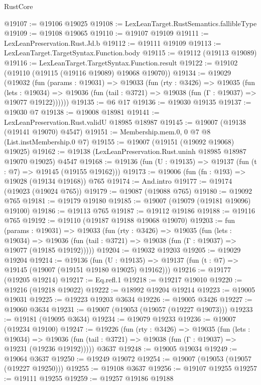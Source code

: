 \begin{lexlean}{RustCore}
\begin{coremodule}
@19107 := @19106 @19025
@19108 := LexLeanTarget.RustSemantics.fallibleType
@19109 := @19108 @19065
@19110 := @19107 @19109
@19111 := LexLeanPreservation.Rust.Jd.b
@19112 := @19111 @19109
@19113 := LexLeanTarget.TargetSyntax.Function.body
@19115 := @19112 (@19113 @19089)
@19116 := LexLeanTarget.TargetSyntax.Function.result
@19122 := @19102 (@19110 (@19115 (@19116 @19089) @19068 @19070))
@19134 := @19029
    (@19032
      (fun (params : @19031) =>
      @19033
        (fun (rty : @3426) =>
        @19035
          (fun (lets : @19034) =>
          @19036 (fun (tail : @3721) => @19038 (fun (Γ : @19037) => @19077 @19122))))))
@19135 := @6 @17
@19136 := @19030 @19135
@19137 := @19030 @7
@19138 := @19008 @18981
@19141 := LexLeanPreservation.Rust.validU @18985 @18987
@19145 := @19007 (@19138 (@19141 @19070) @4547)
@19151 := Membership.mem.{0, 0} @7 @8 (List.instMembership.{0} @7)
@19155 := @19007 (@19151 (@19092 @19068) @19025)
@19162 := @19138 (LexLeanPreservation.Rust.uninh @18985 @18987 @19070 @19025) @4547
@19168 := @19136 (fun (U : @19135) => @19137 (fun (t : @7) => @19145 (@19155 @19162)))
@19173 := @19006 (fun (fn : @193) => @19028 (@19134 @19168)) @765
@19174 := And.intro
@19177 := @19174 (@19023 (@19024 @765))
@19179 := @19087 (@19088 @765)
@19180 := @19092 @765
@19181 := @19179 @19180
@19185 := @19007 (@19079 (@19181 @19096) @19100)
@19186 := @19113 @765
@19187 := @19112 @19186
@19188 := @19116 @765
@19192 := @19110 (@19187 @19188 @19068 @19070)
@19203 := fun (params : @19031) =>
  @19033
    (fun (rty : @3426) =>
    @19035
      (fun (lets : @19034) =>
      @19036 (fun (tail : @3721) => @19038 (fun (Γ : @19037) => @19077 (@19185 @19192)))))
@19204 := @19032 @19203
@19205 := @19029 @19204
@19214 := @19136
    (fun (U : @19135) => @19137 (fun (t : @7) => @19145 (@19007 (@19151 @19180 @19025) @19162)))
@19216 := @19177 (@19205 @19214)
@19217 := Eq.refl.{1}
@19218 := @19217 @19010
@19220 := @19216 (@19218 @19022)
@19222 := @18992 @19204 @19214
@19223 := @19005 @19031
@19225 := @19223 @19203 @3634
@19226 := @19005 @3426
@19227 := @19060 @3634
@19231 := @19007 (@19053 (@19057 (@19227 @19073)))
@19233 := @19181 (@19095 @3634)
@19234 := @19079 @19233
@19236 := @19007 (@19234 @19100)
@19247 := @19226
    (fun (rty : @3426) =>
    @19035
      (fun (lets : @19034) =>
      @19036 (fun (tail : @3721) => @19038 (fun (Γ : @19037) => @19231 (@19236 @19192)))))
    @3637
@19248 := @19005 @19034
@19249 := @19064 @3637
@19250 := @19249 @19072
@19254 := @19007 (@19053 (@19057 (@19227 @19250)))
@19255 := @19108 @3637
@19256 := @19107 @19255
@19257 := @19111 @19255
@19259 := @19257 @19186 @19188

\end{coremodule}
\end{lexlean}
